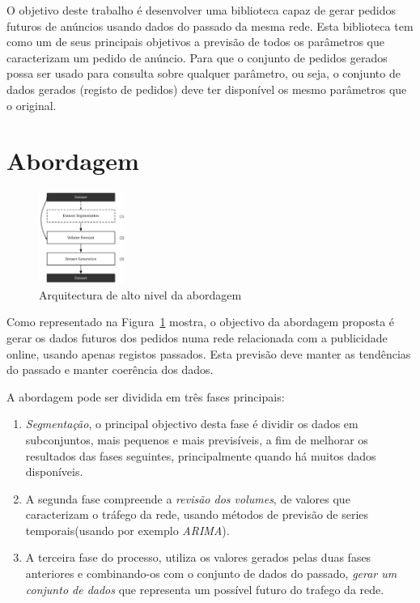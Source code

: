 \documentclass[9pt,a4paper]{extarticle}
\begin{document}
\begin{multicols}{2}
O objetivo deste trabalho é desenvolver uma biblioteca capaz de gerar pedidos
futuros de anúncios usando dados do passado da mesma rede. Esta biblioteca tem
como um de seus principais objetivos a previsão de todos os parâmetros que
caracterizam um pedido de anúncio. Para que o conjunto de pedidos gerados possa
ser usado para consulta sobre qualquer parâmetro, ou seja, o conjunto de dados
gerados (registo de pedidos) deve ter disponível os mesmo parâmetros que o
original.

\section{Abordagem}

\begin{figure}[H]
\centering
\includegraphics[width=0.25\textwidth]{high_level} \caption{Arquitectura de alto
nivel da abordagem} \label{fig:highlevel_arch} \end{figure}

Como representado na Figura~\ref{fig:highlevel_arch} mostra, o objectivo da
abordagem proposta é gerar os dados futuros dos pedidos numa rede relacionada
com a publicidade online, usando apenas registos passados.
Esta previsão deve manter as tendências do passado e manter coerência dos dados.

A abordagem pode ser dividida em três fases principais:
\begin{enumerate}
\item \emph{Segmentação}, o principal objectivo desta fase é dividir os dados
  em subconjuntos, mais pequenos e mais previsíveis, a fim de melhorar os
  resultados das fases seguintes, principalmente quando há muitos dados
  disponíveis.

\item A segunda fase compreende a \emph{revisão dos volumes}, de valores que
  caracterizam o tráfego da rede, usando métodos de previsão de series
  temporais(usando por exemplo \emph{ARIMA}).

\item A terceira fase do processo, utiliza os valores gerados pelas duas fases
  anteriores e combinando-os com o conjunto de dados do passado,
  \emph{gerar um conjunto de dados} que representa um possível futuro do trafego da rede. 
\end{enumerate}


\end{multicols}
\end{document}
